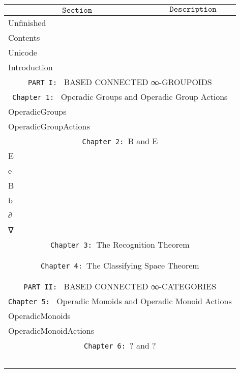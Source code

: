 \documentclass{book}
\theoremstyle{definition}
\begin{document}
{
\footnotesize
\begin{longtable}{|| l || l ||} 
\hline
\multicolumn{1}{||c||}{$\texttt{Section}$} & \multicolumn{1}{|c||}{$\texttt{Description}$} \\
\hline
\hline
Unfinished & \\
\hline
Contents & \\
\hline
Unicode & \\
\hline
Introduction & \\
\hline \hline
\multicolumn{2}{||c||}{\texttt{PART I: } BASED CONNECTED ∞-GROUPOIDS} \\
\hline \hline
\multicolumn{2}{||c||}{\texttt{Chapter 1: } Operadic Groups and Operadic Group Actions} \\
\hline \hline
OperadicGroups & \\
\hline
OperadicGroupActions & \\
\hline \hline
\multicolumn{2}{||c||}{\texttt{Chapter 2: }B and E} \\
\hline \hline
E  &  \\
\hline
e  & \\
\hline
B &  \\
\hline
b & \\
\hline
∂ &  \\
\hline
∇  & \\
\hline
\multicolumn{2}{||c||}{\texttt{Chapter 3: }The Recognition Theorem} \\
\hline \hline
 & \\
\hline
 & \\
\multicolumn{2}{||c||}{\texttt{Chapter 4: }The Classifying Space Theorem} \\
\hline \hline
 & \\
\hline
 & \\
\hline \hline
\multicolumn{2}{||c||}{\texttt{PART II: } BASED CONNECTED ∞-CATEGORIES} \\
\hline \hline
\multicolumn{2}{||c||}{\texttt{Chapter 5: } Operadic Monoids and Operadic Monoid Actions} \\
\hline \hline
OperadicMonoids & \\
\hline 
OperadicMonoidActions & \\
\hline \hline
\multicolumn{2}{||c||}{\texttt{Chapter 6: }? and ?} \\
\hline \hline
 & \\
\hline
  & \\
\hline
  & \\
\hline
  & \\
 \hline
  & \\

\end{longtable}}
\end{document}
